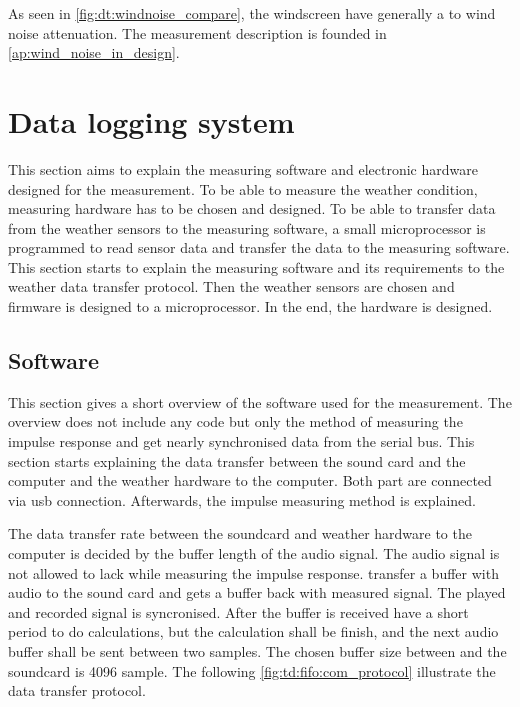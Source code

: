 As seen in \autoref{fig:dt:windnoise_compare}, the windscreen have generally a  to  wind noise attenuation. The measurement description is founded in \autoref{ap:wind_noise_in_design}. 



\section{Data logging system} 
This section aims to explain the measuring software and electronic hardware designed for the measurement. To be able to measure the weather condition, measuring hardware has to be chosen and designed. To be able to transfer data from the weather sensors to the measuring software, a small microprocessor is programmed to read sensor data and transfer the data to the measuring software. This section starts to explain the measuring software and its requirements to the weather data transfer protocol. Then the weather sensors are chosen and firmware is designed to a microprocessor. In the end, the hardware is designed.

\subsection{Software}
This section gives a short overview of the \matlab software used for the measurement. The overview does not include any code but only the method of measuring the impulse response and get nearly synchronised data from the serial bus. This section starts explaining the data transfer between the sound card and the computer and the weather hardware to the computer. Both part are connected via \gls{usb} connection. Afterwards, the impulse measuring method is explained.

The data transfer rate between the soundcard and weather hardware to the computer is decided by the buffer length of the audio signal. The audio signal is not allowed to lack while measuring the impulse response. \matlab transfer a buffer with audio to the sound card and gets a buffer back with measured signal. The played and recorded signal is syncronised. After the buffer is received \matlab have a short period to do calculations, but the calculation shall be finish, and the next audio buffer shall be sent between two samples.  The chosen buffer size between \matlab and the soundcard is 4096 sample. The following \autoref{fig:td:fifo:com_protocol} illustrate the data transfer protocol.


